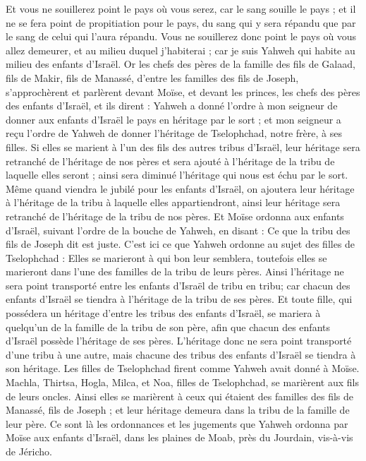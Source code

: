 \begin{multicols}{2}
Et vous ne souillerez point le pays où vous serez, car le sang souille le pays ; et il ne se fera point de propitiation pour le pays, du sang qui y sera répandu que par le sang de celui qui l'aura répandu.
Vous ne souillerez donc point le pays où vous allez demeurer, et au milieu duquel j'habiterai ; car je suis Yahweh qui habite au milieu des enfants d'Israël.
\VerseOne{}Or les chefs des pères de la famille des fils de Galaad, fils de Makir, fils de Manassé, d'entre les familles des fils de Joseph, s'approchèrent et parlèrent devant Moïse, et devant les princes, les chefs des pères des enfants d'Israël,
et ils dirent : Yahweh a donné l'ordre à mon seigneur de donner aux enfants d'Israël le pays en héritage par le sort ; et mon seigneur a reçu l'ordre de Yahweh de donner l'héritage de Tselophchad, notre frère, à ses filles.
Si elles se marient à l'un des fils des autres tribus d'Israël, leur héritage sera retranché de l'héritage de nos pères et sera ajouté à l'héritage de la tribu de laquelle elles seront ; ainsi sera diminué l'héritage qui nous est échu par le sort.
Même quand viendra le jubilé pour les enfants d'Israël, on ajoutera leur héritage à l'héritage de la tribu à laquelle elles appartiendront, ainsi leur héritage sera retranché de l'héritage de la tribu de nos pères.
Et Moïse ordonna aux enfants d'Israël, suivant l'ordre de la bouche de Yahweh, en disant : Ce que la tribu des fils de Joseph dit est juste.
C'est ici ce que Yahweh ordonne au sujet des filles de Tselophchad : Elles se marieront à qui bon leur semblera, toutefois elles se marieront dans l'une des familles de la tribu de leurs pères.
Ainsi l'héritage ne sera point transporté entre les enfants d'Israël de tribu en tribu; car chacun des enfants d'Israël se tiendra à l'héritage de la tribu de ses pères.
Et toute fille, qui possédera un héritage d'entre les tribus des enfants d'Israël, se mariera à quelqu'un de la famille de la tribu de son père, afin que chacun des enfants d'Israël possède l'héritage de ses pères.
L'héritage donc ne sera point transporté d'une tribu à une autre, mais chacune des tribus des enfants d'Israël se tiendra à son héritage.
Les filles de Tselophchad firent comme Yahweh avait donné à Moïse.
Machla, Thirtsa, Hogla, Milca, et Noa, filles de Tselophchad, se marièrent aux fils de leurs oncles.
Ainsi elles se marièrent à ceux qui étaient des familles des fils de Manassé, fils de Joseph ; et leur héritage demeura dans la tribu de la famille de leur père.
Ce sont là les ordonnances et les jugements que Yahweh ordonna par Moïse aux enfants d'Israël, dans les plaines de Moab, près du Jourdain, vis-à-vis de Jéricho.
\PPE{}
\end{multicols}
